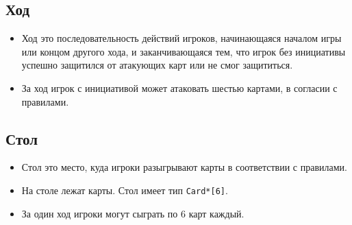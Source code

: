 \documentclass[a4paper,12pt]{article}
\begin{document}
        \subsection{Ход}
            \begin{itemize}
                \item[] Ход это последовательность действий игроков,
                        начинающаяся началом игры или концом другого хода,
                        и заканчивающаяся тем, что игрок без инициативы успешно
                        защитился от атакующих карт или не смог защититься.
                \item[] За ход игрок с инициативой может атаковать шестью картами, в согласии с правилами. 
            \end{itemize}

        \subsection{Стол}
            \begin{itemize}
                \item[] Стол это место, куда игроки разыгрывают карты в соответствии с правилами.
                \item[] На столе лежат карты. Стол имеет тип \texttt{Card*[6]}.
                \item[] За один ход игроки могут сыграть по 6 карт каждый.
            \end{itemize}
\end{document}
